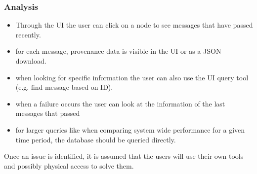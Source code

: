 \subsubsection{Analysis}
\begin{itemize}
  \item Through the UI the user can click on a node to see messages that have passed recently.
  \item for each message, provenance data is visible in the UI or as a JSON download.
  \item when looking for specific information the user can also use the UI query tool (e.g. find message based on ID).
  \item when a failure occurs the user can look at the information of the last messages that passed 
  \item for larger queries like when comparing system wide performance for a given time period, the database should be queried directly.
\end{itemize}

Once an issue is identified, it is assumed that the users will use their own tools and possibly physical access to solve them.